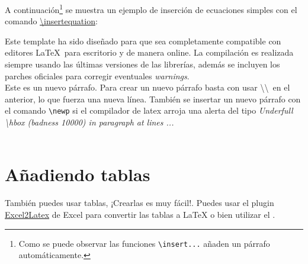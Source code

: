 
	A continuación\footnote{Como se puede observar las funciones \texttt{\textbackslash insert...} añaden un párrafo automáticamente.} se muestra un ejemplo de inserción de ecuaciones simples con el comando \href{https://latex.ppizarror.com/informe.html#hlp-formulae}{\textbackslash insertequation}:


	Este template ha sido diseñado para que sea completamente compatible con editores \LaTeX\ para escritorio y de manera online. La compilación es realizada siempre usando las últimas versiones de las librerías, además se incluyen los parches oficiales para corregir eventuales \textit{warnings}. \\

	Este es un nuevo párrafo. Para crear un nuevo párrafo basta con usar \textbackslash\textbackslash\ en el anterior, lo que fuerza una nueva línea. También se insertar un nuevo párrafo con el comando \texttt{\textbackslash newp} si el compilador de latex arroja una alerta del tipo \textit{Underfull \textbackslash hbox (badness 10000) in paragraph at lines ...} \\

	\lipsum[4] \\

	\lipsum[11]

\section{Añadiendo tablas}

También puedes usar tablas, ¡Crearlas es muy fácil!. Puedes usar el plugin \href{https://www.ctan.org/tex-archive/support/excel2latex}{Excel2Latex} \cite{excel2latex} de Excel para convertir las tablas a \LaTeX\xspace o bien utilizar el  \cite{tablesgenerator}.

